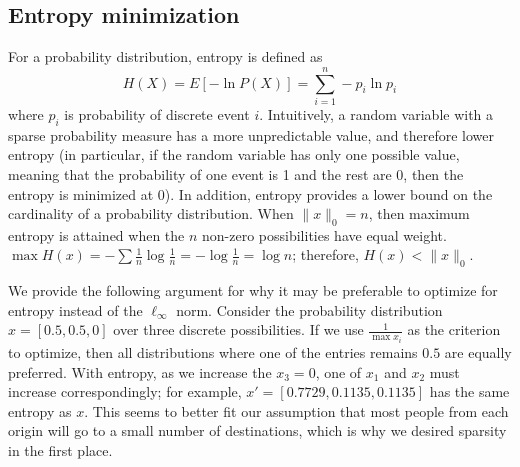 \documentclass{article} %
\begin{document}
\subsection{Entropy minimization}
For a probability distribution, entropy is defined as
\begin{equation*} H(X) = E[-\ln P(X)] = \sum_{i=1}^{n} -p_i \ln p_i \end{equation*}
where $p_i$ is probability of discrete event $i$.
Intuitively, a random variable with a sparse probability measure has a more unpredictable value, and therefore lower entropy (in particular, if the random variable has only one possible value, meaning that the probability of one event is 1 and the rest are 0, then the entropy is minimized at 0).
In addition, entropy provides a lower bound on the cardinality of a probability distribution. When $\|x\|_0 = n$, then maximum entropy is attained when the $n$ non-zero possibilities have equal weight. $\max H(x) = -\sum \frac{1}{n} \log \frac{1}{n} = -\log \frac{1}{n} = \log n$; therefore, $H(x) < \|x\|_0$.

We provide the following argument for why it may be preferable to optimize for entropy instead of the $\ell_\infty$ norm.
Consider the probability distribution $x = [0.5, 0.5, 0]$ over three discrete possibilities.
If we use $\frac{1}{\max x_i}$ as the criterion to optimize, then all distributions where one of the entries remains $0.5$ are equally preferred.
With entropy, as we increase the $x_3 = 0$, one of $x_1$ and $x_2$ must increase correspondingly; for example, $x' = [0.7729, 0.1135, 0.1135]$ has the same entropy as $x$.
This seems to better fit our assumption that most people from each origin will go to a small number of destinations, which is why we desired sparsity in the first place.
\end{document}
